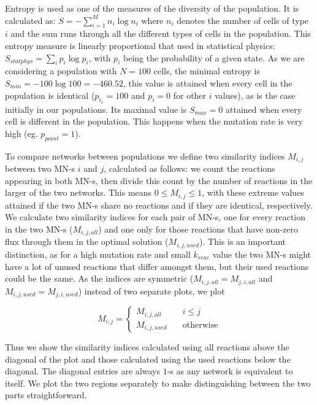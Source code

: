 \documentclass[a4paper,12pt]{article}
\begin{document}
Entropy is used as one of the measures of the diversity of the population. It is calculated as: $S=- \sum^{M}_{i=1} n_i \log n_i $ where $n_i$ denotes the number of cells of type $i$ and the sum runs through all the different types of cells in the population. This entropy measure is linearly proportional that used in statistical physics: $S_{statphys}=\sum_i p_i \log p_i$, with $p_i$ being the probability of a given state. As we are considering a population with $N=100$ cells, the minimal entropy is $S_{min}=-100\log100=-460.52$, this value is attained when every cell in the population is identical ($p_{i_1}=100$ and $p_i=0$ for other $i$ values), as is the case initially in our populations. Its maximal value is $S_{max}=0$ attained when every cell is different in the population. This happens when the mutation rate is very high (eg. $p_{point}=1$). 


To compare networks between populations we define two similarity indices $M_{i,j}$ between two MN-s $i$ and $j$, calculated as follows: we count the reactions appearing in both MN-s, then divide this count by the number of reactions in the larger of the two networks. This means $0\leq M_{i,j} \leq 1$, with these extreme values attained if the two MN-s share no reactions and if they are identical, respectively. We calculate two similarity indices for each pair of MN-s, one for every reaction in the two MN-s ($M_{i,j,all}$) and one only for those reactions that have non-zero flux through them in the optimal solution ($M_{i,j,used}$). This is an important distinction, as for a high mutation rate and small $k_{reac}$ value the two MN-s might have a lot of unused reactions that differ amongst them, but their used reactions could be the same. As the indices are symmetric ($M_{i,j,all}=M_{j,i,all}$ and $M_{i,j,used}=M_{j,i,used}$) instead of two separate plots, we plot 

$$
M_{i,j}= \left\{
	\begin{array}{ll}
		M_{i,j,all} & \quad i \leq j \\
		M_{i,j,used} & \quad \text{otherwise}
	\end{array}
\right.
$$

Thus we show the similarity indices calculated using all reactions above the diagonal of the plot and those calculated using the used reactions below the diagonal. The diagonal entries are always $1$-s as any network is equivalent to itself. We plot the two regions separately to make distinguishing between the two parts straightforward.
\end{document}

